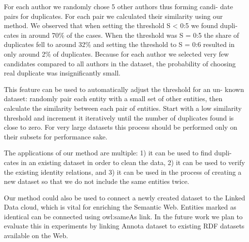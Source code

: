 \documentclass{llncs}
\begin{document}
For each author we randomly chose 5 other authors thus forming candi-
date pairs for duplicates. For each pair we calculated their similarity using our
method. We observed that when setting the threshold S < 0:5 we found dupli-
cates in around 70\% of the cases. When the threshold was S = 0:5 the share
of duplicates fell to around 32\% and setting the threshold to S = 0:6 resulted
in only around 2\% of duplicates. Because for each author we selected very few
candidates compared to all authors in the dataset, the probability of choosing
real duplicate was insignificantly small.

This feature can be used to automatically adjust the threshold for an un-
known dataset: randomly pair each entity with a small set of other entities, then
calculate the similarity between each pair of entities. Start with a low similarity
threshold and increment it iteratively until the number of duplicates found is
close to zero. For very large datasets this process should be performed only on
their subsets for performance sake.

The applications of our method are multiple: 1) it can be used to find dupli-
cates in an existing dataset in order to clean the data, 2) it can be used to verify
the existing identity relations, and 3) it can be used in the process of creating a
new dataset so that we do not include the same entities twice.

Our method could also be used to connect a newly created dataset to the
Linked Data cloud, which is vital for enriching the Semantic Web. Entities
marked as identical can be connected using owl:sameAs link. In the future work
we plan to evaluate this in experiments by linking Annota dataset to existing
RDF datasets available on the Web.
\end{document}
